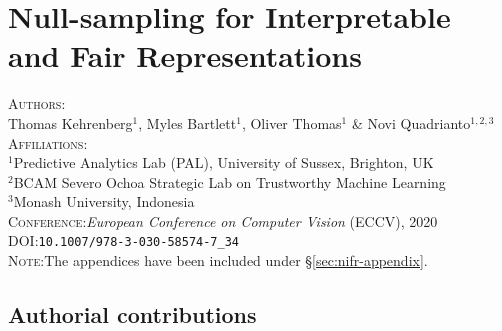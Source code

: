\chapter{Null-sampling for Interpretable and Fair Representations}\label{ch:nifr}
\textsc{Authors}:\\
%
Thomas Kehrenberg$^1$,
%
Myles Bartlett$^1$,
%
Oliver Thomas$^1$ \&
%
Novi Quadrianto$^{1,2,3}$ \\
%
\textsc{Affiliations}:\\
%
$^1$Predictive Analytics Lab (PAL), University of Sussex, Brighton, UK\\
%
$^2$BCAM Severo Ochoa Strategic Lab on Trustworthy Machine Learning \\
%
$^3$Monash University, Indonesia \\
%
\textsc{Conference}:\;\;\textit{European Conference on Computer Vision} (ECCV), 2020 \\
%
\textsc{DOI}:\;\;\texttt{10.1007/978-3-030-58574-7\_34} \\
%
\textsc{Note}:\;\;The appendices have been included under \S\ref{sec:nifr-appendix}.
%







% 
\newpage

\clearpage
\section{Authorial contributions}

